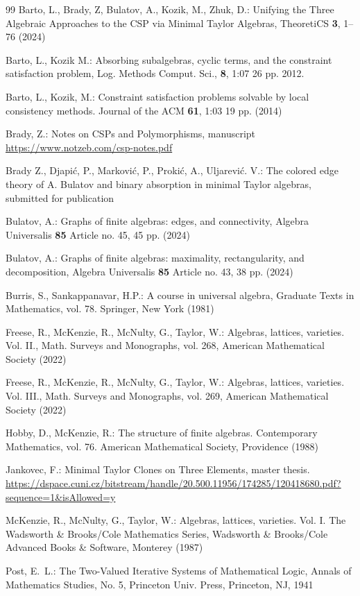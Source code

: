 \documentclass[11pt]{amsart}
\theoremstyle{definition}
\theoremstyle{remark}
\theoremstyle{plain}
\begin{document}
\begin{thebibliography}{99}
	Barto, L., Brady, Z, Bulatov, A., Kozik, M., Zhuk, D.: 
	Unifying the Three Algebraic Approaches to the CSP via Minimal Taylor Algebras, 
	TheoretiCS 
	{\bf 3},
	1--76
	(2024)

 Barto, L., Kozik M.: 
	Absorbing subalgebras, cyclic terms, and the constraint satisfaction problem,
	Log. Methods Comput. Sci.,
	{\bf 8}, 
	1:07
	26 pp.
	2012.

	Barto, L., Kozik, M.: 
	Constraint satisfaction problems solvable by local consistency methods.
	Journal of the ACM
	{\bf 61},
	1:03
	19 pp.
	(2014)


	Brady, Z.:
	Notes on CSPs and Polymorphisms, 
	manuscript
	\url{https://www.notzeb.com/csp-notes.pdf}

 Brady Z., Djapi\'{c}, P., Markovi\'{c}, P., Proki\'{c}, A., Uljarevi\'{c}. V.: 
	The colored edge theory of A. Bulatov and binary absorption in minimal Taylor algebras, 
	submitted for publication

 Bulatov, A.:
	Graphs of finite algebras: edges, and connectivity,
	Algebra Universalis
	{\bf 85}
	Article no. 45,
	45 pp.
	(2024)
	
	Bulatov, A.:
	Graphs of finite algebras: maximality, rectangularity, and decomposition,
	Algebra Universalis
	{\bf 85}
	Article no. 43,
	38 pp.
	(2024)
	
	Burris, S., Sankappanavar, H.P.:
	A course in universal algebra,
	Graduate Texts in Mathematics, vol. 78.
	Springer,
	New York
	(1981)

	Freese, R., McKenzie, R., McNulty, G., Taylor, W.:
	Algebras, lattices, varieties. Vol. II.,
	Math. Surveys and Monographs, vol. 268,
	American Mathematical Society (2022)

	Freese, R., McKenzie, R., McNulty, G., Taylor, W.:
	Algebras, lattices, varieties. Vol. III.,
	Math. Surveys and Monographs, vol. 269,
	American Mathematical Society (2022)

	Hobby, D., McKenzie, R.:
	The structure of finite algebras.
	Contemporary Mathematics, vol. 76.
	American Mathematical Society, Providence (1988)

    Jankovec, F.:
    Minimal Taylor Clones on Three Elements,
    master thesis.
    \url{https://dspace.cuni.cz/bitstream/handle/20.500.11956/174285/120418680.pdf?sequence=1&isAllowed=y}

	McKenzie, R., McNulty, G., Taylor, W.:
	Algebras, lattices, varieties. Vol. I.
	The Wadsworth \& Brooks/Cole Mathematics Series,
	Wadsworth \& Brooks/Cole Advanced Books \& Software, Monterey (1987)

    Post, E.~L.:
    The Two-Valued Iterative Systems of Mathematical Logic, 
    Annals of Mathematics Studies,
    No. 5,
    Princeton Univ. Press, 
    Princeton, NJ,
    1941

\end{thebibliography}
\end{document}
